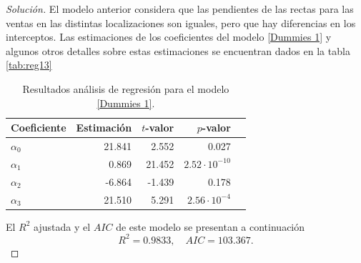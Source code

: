 \documentclass[10.5pt,notitlepage]{article}
\newenvironment{solucion}
  {\begin{proof}[Solución]}
  {\end{proof}}
\theoremstyle{plain}
\begin{document}
\begin{solucion}
El modelo anterior considera que las pendientes de las rectas para las ventas en las distintas localizaciones son iguales, pero que hay diferencias en los interceptos. Las estimaciones de los coeficientes del modelo \eqref{Dummies 1} y algunos otros detalles sobre estas estimaciones se encuentran dados en la tabla \eqref{tab:reg13} 
\begin{table}[H]
        \centering
        \begin{tabular}{@{}l@{\hskip 0.3in}r@{\hskip 0.3in}r@{\hskip 0.3in}r@{\hskip 0.3in}r@{}}
            \toprule
            Coeficiente& Estimación &\(t\)-valor& \(p\)-valor \\
            \midrule
            \(\alpha_{0}\) & 21.841 &2.552  & 0.027\\
            \(\alpha_{1}\) & 0.869 &21.452  &\(2.52\cdot10^{-10}\) \\
            \(\alpha_{2}\) & -6.864&-1.439  & 0.178\\   
            \(\alpha_{3}\) & 21.510&5.291  & \(2.56 \cdot 10^{-4}\)\\ 
            \bottomrule
        \end{tabular}
        \caption{Resultados análisis de regresión para el modelo \eqref{Dummies 1}.}
        \label{tab:reg13}
\end{table}
El \(R^2\) ajustada y el \(AIC\) de este modelo se presentan a continuación
\begin{equation}\label{AIC RRRR}
    R^2 =  0.9833, \quad AIC = 103.367.
\end{equation}


\end{solucion}
\end{document}
